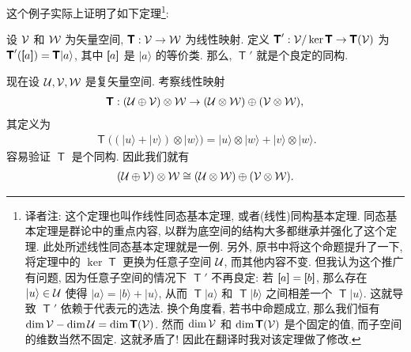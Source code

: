 \documentclass[lang=cn,zihao=-4,twoside,fontset=none]{textbook}
\newcommand{\equivclass}[1]{\left[\hspace{-3pt}\left[#1\right]\hspace{-2.5pt}\right]}
\newcommand{\bsf}[1]{{\mathop{\pmb{\mathsf{#1}}}}}
\def\EQ#1{\begin{equation}\begin{aligned}{}#1\end{aligned}\end{equation}}
\def\eq#1{\[\begin{aligned}{}#1\end{aligned}\]}
\renewcommand{\ket}[1]{| #1 \rangle}
\begin{document}
这个例子实际上证明了如下定理\footnote{译者注: 这个定理也叫作线性同态基本定理, 或者(线性)同构基本定理. 同态基本定理是群论中的重点内容, 以群为底空间的结构大多都继承并强化了这个定理. 此处所述线性同态基本定理就是一例. 另外, 原书中将这个命题提升了一下, 将定理中的 $\ker\bsf{T}$ 更换为任意子空间 ${\mathcal U}$, 而其他内容不变. 但我认为这个推广有问题, 因为任意子空间的情况下 $\bsf{T}'$ 不再良定: 若 $\equivclass{a}=\equivclass{b}$, 那么存在 $\ket{u}\in\mU$ 使得 $\ket{a}=\ket{b}+\ket{u}$, 从而 $\bsf{T}\ket{a}$ 和 $\bsf{T}\ket{b}$ 之间相差一个 $\bsf{T}\ket{u}$. 这就导致 $\bsf{T}'$ 依赖于代表元的选法. 换个角度看, 若书中命题成立, 那么我们恒有 $\dim\mV-\dim\mU=\dim\bsf{T}(\mV)$. 然而 $\dim{\mathcal V}$ 和 $\dim\bsf{T}(\mV)$ 是个固定的值, 而子空间的维数当然不固定. 这就矛盾了! 因此在翻译时我对该定理做了修改.}:

\begin{theorem}
    \label{thm:2.3.23}%
    设 ${\mathcal V}$ 和 ${\mathcal W}$ 为矢量空间, $\bsf{T}:\mV\to\mW$ 为线性映射. 定义 $\bsf{T}':\mV/\ker\bsf{T}\to\bsf{T}(\mV)$ 为 $\bsf{T}'(\equivclass{a})=\bsf{T}\ket{a}$, 其中 $\equivclass{a}$ 是 $\ket{a}$ 的等价类. 那么, $\bsf{T}'$ 就是个良定的同构. 
\end{theorem}

现在设 ${\mathcal U},{\mathcal V},{\mathcal W}$ 是复矢量空间. 考察线性映射 
\eq{
    \bsf{T}:(\mU\oplus\mV)\otimes\mW\to(\mU\otimes\mW)\oplus(\mV\otimes\mW),
}
其定义为 
\eq{
    \bsf{T}((\ket{u}+\ket{v})\otimes\ket{w})=\ket{u}\otimes\ket{w}+\ket{v}\otimes\ket{w}.
}
容易验证 $\bsf{T}$ 是个同构. 因此我们就有 
\EQ{
    (\mU\oplus\mV)\otimes\mW\cong(\mU\otimes\mW)\oplus(\mV\otimes\mW). \label{eq:2.16}
}
\end{document}
